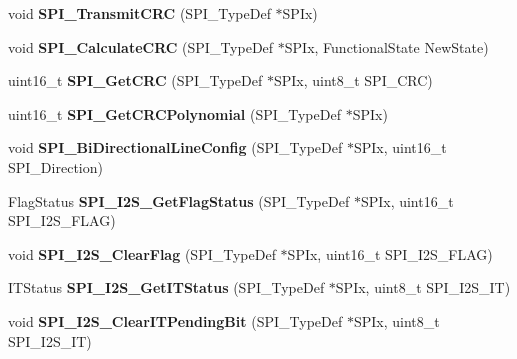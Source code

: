 \begin{DoxyCompactItemize}
\item 
\hypertarget{group__SPI__Exported__Functions_gace8b1058e09bab150b0dbe5978810273}{
void {\bfseries SPI\_\-TransmitCRC} (SPI\_\-TypeDef $\ast$SPIx)}
\label{group__SPI__Exported__Functions_gace8b1058e09bab150b0dbe5978810273}

\item 
\hypertarget{group__SPI__Exported__Functions_ga64f7276d119e6cb58afc100f8832adb0}{
void {\bfseries SPI\_\-CalculateCRC} (SPI\_\-TypeDef $\ast$SPIx, FunctionalState NewState)}
\label{group__SPI__Exported__Functions_ga64f7276d119e6cb58afc100f8832adb0}

\item 
\hypertarget{group__SPI__Exported__Functions_ga4c81c193516e82cf0a2fdc149ef20cc6}{
uint16\_\-t {\bfseries SPI\_\-GetCRC} (SPI\_\-TypeDef $\ast$SPIx, uint8\_\-t SPI\_\-CRC)}
\label{group__SPI__Exported__Functions_ga4c81c193516e82cf0a2fdc149ef20cc6}

\item 
\hypertarget{group__SPI__Exported__Functions_ga80fb9374cfce670f29128bb78568353f}{
uint16\_\-t {\bfseries SPI\_\-GetCRCPolynomial} (SPI\_\-TypeDef $\ast$SPIx)}
\label{group__SPI__Exported__Functions_ga80fb9374cfce670f29128bb78568353f}

\item 
\hypertarget{group__SPI__Exported__Functions_ga166171c421fc51da7714723524d41b45}{
void {\bfseries SPI\_\-BiDirectionalLineConfig} (SPI\_\-TypeDef $\ast$SPIx, uint16\_\-t SPI\_\-Direction)}
\label{group__SPI__Exported__Functions_ga166171c421fc51da7714723524d41b45}

\item 
\hypertarget{group__SPI__Exported__Functions_ga1bd785d129e09c5734a876c8f2767204}{
FlagStatus {\bfseries SPI\_\-I2S\_\-GetFlagStatus} (SPI\_\-TypeDef $\ast$SPIx, uint16\_\-t SPI\_\-I2S\_\-FLAG)}
\label{group__SPI__Exported__Functions_ga1bd785d129e09c5734a876c8f2767204}

\item 
\hypertarget{group__SPI__Exported__Functions_ga3aabd9e2437e213056c0ed9bdfa1a724}{
void {\bfseries SPI\_\-I2S\_\-ClearFlag} (SPI\_\-TypeDef $\ast$SPIx, uint16\_\-t SPI\_\-I2S\_\-FLAG)}
\label{group__SPI__Exported__Functions_ga3aabd9e2437e213056c0ed9bdfa1a724}

\item 
\hypertarget{group__SPI__Exported__Functions_ga72decbc1cd79f8fad92a2204beca6bc5}{
ITStatus {\bfseries SPI\_\-I2S\_\-GetITStatus} (SPI\_\-TypeDef $\ast$SPIx, uint8\_\-t SPI\_\-I2S\_\-IT)}
\label{group__SPI__Exported__Functions_ga72decbc1cd79f8fad92a2204beca6bc5}

\item 
\hypertarget{group__SPI__Exported__Functions_ga35a524a49ff3d058137060f751e8749f}{
void {\bfseries SPI\_\-I2S\_\-ClearITPendingBit} (SPI\_\-TypeDef $\ast$SPIx, uint8\_\-t SPI\_\-I2S\_\-IT)}
\label{group__SPI__Exported__Functions_ga35a524a49ff3d058137060f751e8749f}

\end{DoxyCompactItemize}
